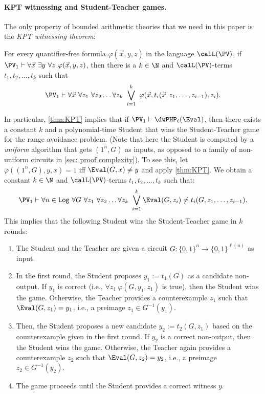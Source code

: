 \paragraph{KPT witnessing and Student-Teacher games.} The only property of bounded arithmetic theories that we need in this paper is the \emph{KPT witnessing theorem}:


\begin{theorem}\label{thm:KPT}
    For every quantifier-free formula $\varphi(\vec{x},y,z)$ in the language $\calL(\PV)$, if $\PV_1 \vdash \forall \vec{x}~\exists y~\forall z~\varphi(\vec{x},y,z)$, then there is a $k\in \N$ and $\calL(\PV)$-terms $t_1,t_2,\dots,t_k$ such that
    \begin{equation}\label{eqn:KPT}
        \PV_1 \vdash \forall \vec{x}~\forall z_1~\forall z_2 \dots \forall z_k~\bigvee_{i=1}^k~\varphi(\vec{x},t_i(\vec{x},z_1,\dots,z_{i-1}),z_i).
    \end{equation}
\end{theorem}

In particular, \autoref{thm:KPT} implies that if $\PV_1\vdash \dwPHP_\ell(\Eval)$, then there exists a constant $k$ and a polynomial-time Student that wins the Student-Teacher game for the range avoidance problem. (Note that here the Student is computed by a \emph{uniform} algorithm that gets $(1^n, G)$ as inputs, as opposed to a family of non-uniform circuits in \autoref{sec: proof complexity}). To see this, let $\varphi((1^n, G), y, x) = 1$ iff $\Eval(G, x) \ne y$ and apply \autoref{thm:KPT}. We obtain a constant $k\in \N$ and $\calL(\PV)$-terms $t_1, t_2, \dots, t_k$ such that:
\begin{equation}\label{eq: KPT-Avoid}
    \PV_1\vdash \forall n\in\mathsf{Log}~\forall G~\forall z_1~\forall z_2 \dots \forall z_k~\bigvee_{i=1}^k \Eval(G, z_i) \ne t_i(G, z_1, \dots, z_{i-1}).
\end{equation}
This implies that the following Student wins the Student-Teacher game in $k$ rounds:\begin{enumerate}
    \item The Student and the Teacher are given a circuit $G: \{0, 1\}^n \to \{0, 1\}^{\ell(n)}$ as input.
    \item In the first round, the Student proposes $y_1 :=t_1(G)$ as a candidate non-output. If $y_1$ is correct (i.e., $\forall z_1~\varphi(G, y_1, z_1)$ is true), then the Student wins the game. Otherwise, the Teacher provides a counterexample $z_1$ such that $\Eval(G, z_1) = y_1$, i.e., a preimage $z_1\in G^{-1}(y_1)$.
    \item Then, the Student proposes a new candidate $y_2 := t_2(G, z_1)$ based on the counterexample given in the first round. If $y_2$ is a correct non-output, then the Student wins the game. Otherwise, the Teacher again provides a counterexample $z_2$ such that $\Eval(G, z_2) = y_2$, i.e., a preimage $z_2 \in G^{-1}(y_2)$.
    \item The game proceeds until the Student provides a correct witness $y$.
\end{enumerate}

